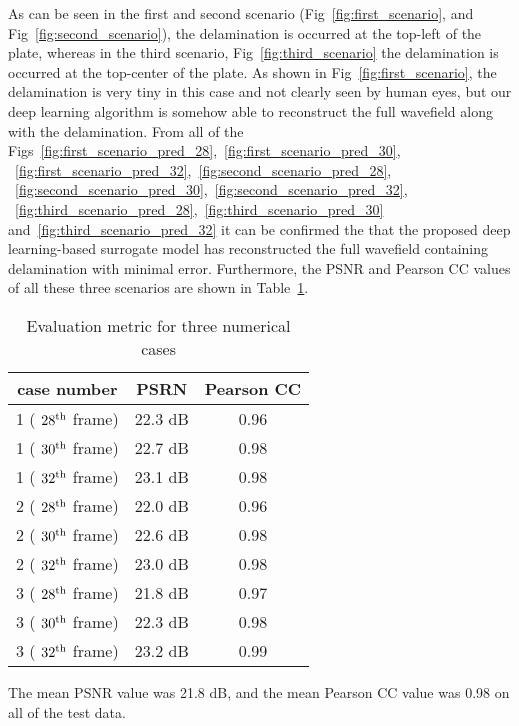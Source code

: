 As can be seen in the first and second scenario (Fig~\ref{fig:first_scenario}, 
and Fig~\ref{fig:second_scenario}),  the delamination is occurred at the 
top-left of the plate, whereas in the third scenario, 
Fig~\ref{fig:third_scenario} the 
delamination is occurred at the top-center of the plate. 
As shown in Fig~\ref{fig:first_scenario}, the delamination is very tiny in this 
case and not clearly seen by human eyes, but our deep learning algorithm is 
somehow able to reconstruct the full wavefield along with the delamination. 
From all of the 
Figs~\ref{fig:first_scenario_pred_28},~\ref{fig:first_scenario_pred_30},
~\ref{fig:first_scenario_pred_32},~\ref{fig:second_scenario_pred_28},
~\ref{fig:second_scenario_pred_30},~\ref{fig:second_scenario_pred_32},
~\ref{fig:third_scenario_pred_28},~\ref{fig:third_scenario_pred_30} 
and~\ref{fig:third_scenario_pred_32} it can be confirmed the that the proposed 
deep learning-based surrogate model has reconstructed the full wavefield 
containing delamination with minimal error. 
Furthermore, the PSNR and Pearson CC values of all these three scenarios are 
shown in Table~\ref{tab:psnr_pearson}. 
\begin{table}[ht]
	\centering
	\caption{Evaluation metric for three numerical cases}
	\begin{tabular}{@{}ccc@{}}
		\toprule
		case number       & PSRN    & Pearson CC \\ \midrule
		1 ( $28\textsuperscript{th}$ frame) & 22.3 dB & 0.96       \\ \midrule
		1 ( $30\textsuperscript{th}$ frame)    & 22.7 dB & 0.98       \\ 
		\midrule
		1 ( $32\textsuperscript{th}$ frame)    & 23.1 dB & 0.98       \\ 
		\midrule
		2 ( $28\textsuperscript{th}$ frame) & 22.0 dB & 0.96       \\ \midrule
		2 ( $30\textsuperscript{th}$ frame)    & 22.6 dB & 0.98       \\ 
		\midrule
		2 ( $32\textsuperscript{th}$ frame)    & 23.0 dB & 0.98       \\ 
		\midrule
		3 ( $28\textsuperscript{th}$ frame) & 21.8 dB & 0.97       \\ \midrule
		3 ( $30\textsuperscript{th}$ frame) & 22.3 dB & 0.98       \\ \midrule
		3 ( $32\textsuperscript{th}$ frame)    & 23.2 dB & 0.99       \\ 
		\bottomrule
	\end{tabular}
	\label{tab:psnr_pearson}
\end{table}


The mean PSNR value was 21.8 dB, and the mean Pearson CC value was 0.98 
on all of the test data.
